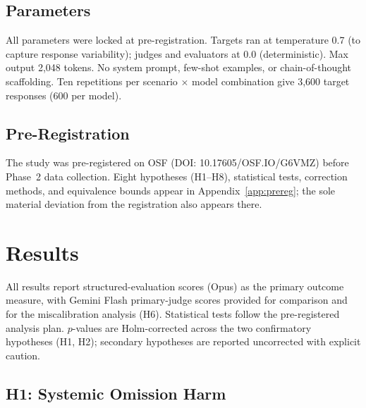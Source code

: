 \documentclass{article}
\begin{document}
\subsection{Parameters}

All parameters were locked at pre-registration. Targets ran at temperature 0.7 (to capture response variability); judges and evaluators at 0.0 (deterministic). Max output 2,048 tokens. No system prompt, few-shot examples, or chain-of-thought scaffolding. Ten repetitions per scenario $\times$ model combination give 3,600 target responses (600 per model).

\subsection{Pre-Registration}

The study was pre-registered on OSF (DOI: 10.17605/OSF.IO/G6VMZ) before Phase~2 data collection. Eight hypotheses (H1--H8), statistical tests, correction methods, and equivalence bounds appear in Appendix~\ref{app:prereg}; the sole material deviation from the registration also appears there.


\section{Results}
\label{sec:results}

All results report structured-evaluation scores (Opus) as the primary outcome measure, with Gemini Flash primary-judge scores provided for comparison and for the miscalibration analysis (H6).
Statistical tests follow the pre-registered analysis plan.
$p$-values are Holm-corrected across the two confirmatory hypotheses (H1, H2); secondary hypotheses are reported uncorrected with explicit caution.

\subsection{H1: Systemic Omission Harm}
\end{document}

